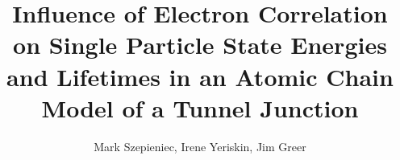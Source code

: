 \documentclass[a4paper]{article}
\author{Mark Szepieniec, Irene Yeriskin, Jim Greer}
\title{Influence of Electron Correlation on Single Particle State Energies and
       Lifetimes in an Atomic Chain Model of a Tunnel Junction}
\begin{document}
\maketitle

\newcommand{\um}[1]{\mathbf{#1}}
\newcommand{\umm}[1]{$\um{#1}$}
\newcommand{\bra}[1]{\langle #1|}
\newcommand{\ket}[1]{|#1 \rangle}
\newcommand{\bracket}[2]{\langle #1|#2 \rangle}
\newcommand{\matel}[3]{\bra{#1} #2 \ket{#3}}
\newcommand{\ai}{{\it ab~initio} }

\begin{abstract}
	
\end{abstract}





\end{document}
